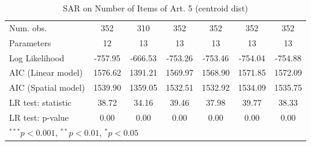 \begin{table}[!h]
\begin{center}
\begin{tabular}{l c c c c c c }
\midrule
Num. obs.               & 352          & 310          & 352          & 352          & 352          & 352          \\
Parameters              & 12           & 13           & 13           & 13           & 13           & 13           \\
Log Likelihood          & -757.95      & -666.53      & -753.26      & -753.46      & -754.04      & -754.88      \\
AIC (Linear model)      & 1576.62      & 1391.21      & 1569.97      & 1568.90      & 1571.85      & 1572.09      \\
AIC (Spatial model)     & 1539.90      & 1359.05      & 1532.51      & 1532.92      & 1534.09      & 1535.75      \\
LR test: statistic      & 38.72        & 34.16        & 39.46        & 37.98        & 39.77        & 38.33        \\
LR test: p-value        & 0.00         & 0.00         & 0.00         & 0.00         & 0.00         & 0.00         \\
\bottomrule
\multicolumn{7}{l}{\scriptsize{$^{***}p<0.001$, $^{**}p<0.01$, $^*p<0.05$}}
\end{tabular}
\caption{SAR on Number of Items of Art. 5 (centroid dist)}
\label{table:coefficients}
\end{center}
\end{table}
